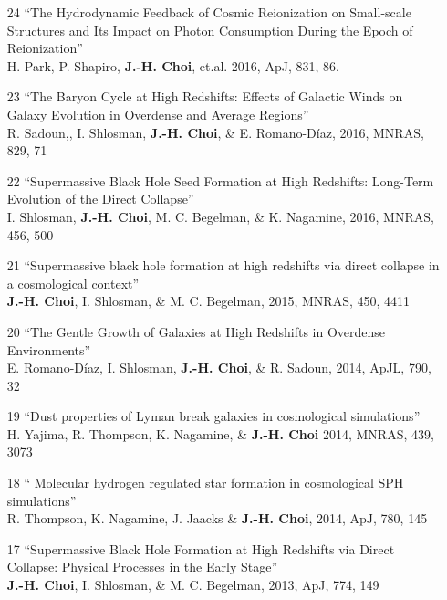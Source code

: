 \documentclass [11pt]{article}
\begin{document}
{{\begin{enumerate}
\item[24] ``The Hydrodynamic Feedback of Cosmic Reionization on Small-scale Structures and Its Impact on Photon Consumption During the Epoch of Reionization''\\ H. Park, P. Shapiro, \textbf{J.-H. Choi}, et.al. 2016, ApJ, 831, 86.
    
\item[23] ``The Baryon Cycle at High Redshifts: Effects of Galactic Winds on Galaxy Evolution in Overdense and Average Regions''\\ R. Sadoun,, I. Shlosman, \textbf{J.-H. Choi}, \& E. Romano-D\'{i}az, 2016, MNRAS, 829, 71

\item[22] ``Supermassive Black Hole Seed Formation at High Redshifts: Long-Term Evolution of the Direct Collapse''\\ I. Shlosman, \textbf{J.-H. Choi}, M. C. Begelman, \& K. Nagamine, 2016, MNRAS, 456, 500

\item[21] ``Supermassive black hole formation at high redshifts via direct collapse in a cosmological context'' \\  \textbf{J.-H. Choi}, I. Shlosman, \& M. C. Begelman, 2015, MNRAS, 450, 4411

\item[20] ``The Gentle Growth of Galaxies at High Redshifts in Overdense Environments'' \\  E. Romano-D\'{i}az, I. Shlosman, \textbf{J.-H. Choi}, \& R. Sadoun, 2014, ApJL, 790, 32

\item[19]``Dust properties of Lyman break galaxies in cosmological simulations'' \\ H. Yajima, R. Thompson, K. Nagamine, \& \textbf{J.-H. Choi} 2014, MNRAS, 439, 3073

\item[18]`` Molecular hydrogen regulated star formation in cosmological SPH simulations'' \\ R. Thompson, K. Nagamine, J. Jaacks \& \textbf{J.-H. Choi}, 2014, ApJ, 780, 145

\item[17] ``Supermassive Black Hole Formation at High Redshifts  via Direct Collapse: Physical Processes in the Early Stage'' \\ \textbf{J.-H. Choi}, I. Shlosman, \& M. C. Begelman, 2013, ApJ, 774, 149


\end{enumerate}}}
\end{document}
